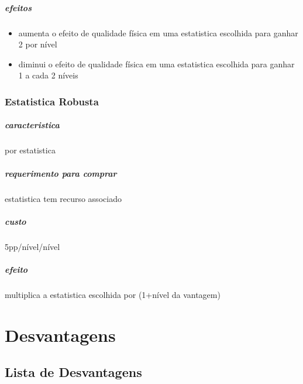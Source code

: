 \paragraph{efeitos}
\begin{itemize}
  \item aumenta o efeito de qualidade física em uma estatistica escolhida para ganhar 2 por nível
  \item diminui o efeito de qualidade física em uma estatistica escolhida para ganhar 1 a cada 2 níveis
\end{itemize}
%
\subsection{Estatistica Robusta}
\paragraph{caracteristica} por estatistica
\paragraph{requerimento para comprar} estatistica tem recurso associado
\paragraph{custo} 5pp/nível/nível
\paragraph{efeito} multiplica a estatistica escolhida por (1+nível da vantagem)
%
%
%
%
\chapter{Desvantagens}
\section{Lista de Desvantagens}

